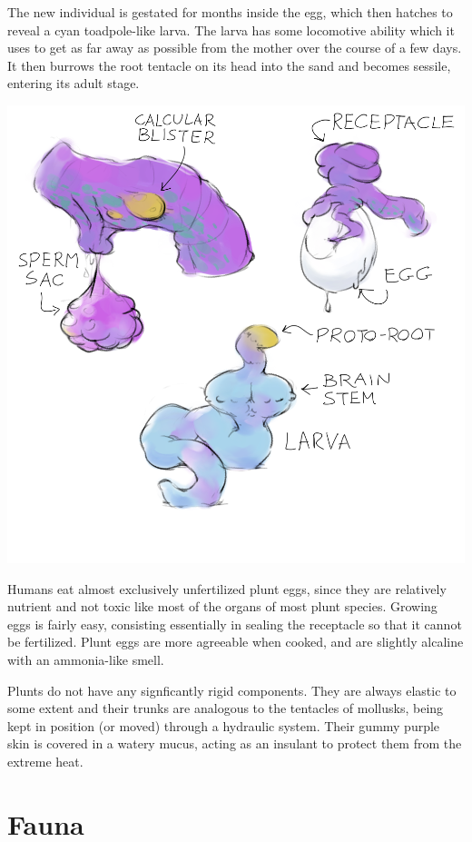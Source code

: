 \documentclass[10pt,oneside]{memoir}
\begin{document}
The new individual is gestated for months inside the egg, which then hatches to reveal a cyan toadpole-like larva. The larva has some locomotive ability which it uses to get as far away as possible from the mother over the course of a few days. It then burrows the root tentacle on its head into the sand and becomes sessile, entering its adult stage.

\begin{center}
\includegraphics[scale=1.9]{../drawings/pluntorgans.png}
\end{center}

Humans eat almost exclusively unfertilized plunt eggs, since they are relatively nutrient and not toxic like most of the organs of most plunt species. Growing eggs is fairly easy, consisting essentially in sealing the receptacle so that it cannot be fertilized. Plunt eggs are more agreeable when cooked, and are slightly alcaline with an ammonia-like smell.

Plunts do not have any signficantly rigid components. They are always elastic to some extent and their trunks are analogous to the tentacles of mollusks, being kept in position (or moved) through a hydraulic system. Their gummy purple skin is covered in a watery mucus, acting as an insulant to protect them from the extreme heat. 

\vfill
\section{Fauna}
\end{document}
